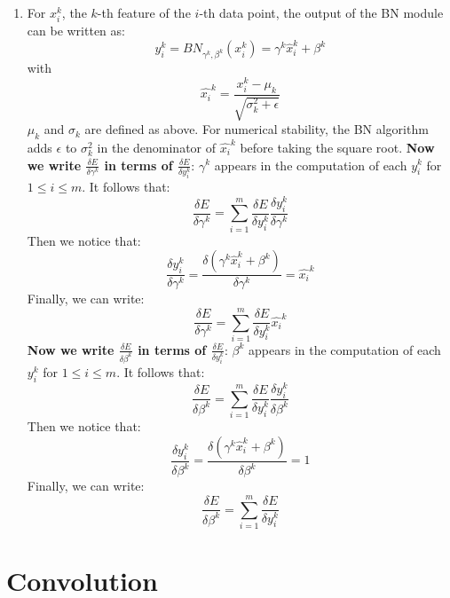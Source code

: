 \documentclass[a4paper]{article}
\begin{document}
\begin{enumerate}
\item{ For $x_i^k$, the $k$-th feature of the $i$-th data point, the output of the BN module can be written as:
$$y_i^k = BN_{\gamma^k,\beta^k}(x_i^k) = \gamma^k \hat{x}_i^k + \beta^k $$
with
$$\hat{x_i}^k = \frac{x_i^k - \mu_k}{\sqrt{\sigma_k^2 + \epsilon}}$$
$\mu_k$ and $\sigma_k$ are defined as above. For numerical stability, the BN algorithm adds $\epsilon$ to $\sigma_k^2$ in the denominator of $\hat{x_i}^k$ before taking the square root.
\newline
\newline
\textbf{Now we write $\frac{\delta E}{\delta \gamma^k}$ in terms of $\frac{\delta E}{\delta y_i^k}$}:
\newline
\newline
$\gamma^k$ appears in the computation of each $y_i^k$ for $1 \leq i \leq m$. It follows that:
$$\frac{\delta E}{\delta \gamma^k} = \sum_{i=1}^m \frac{\delta E}{\delta y_i^k} \frac{\delta y_i^k}{\delta \gamma^k} $$
Then we notice that:
$$ \frac{\delta y_i^k}{\delta \gamma^k} =  \frac{\delta ( \gamma^k \hat{x}_i^k + \beta^k )}{\delta \gamma^k} = \hat{x_i}^k$$
Finally, we can write:
$$\frac{\delta E}{\delta \gamma^k} = \sum_{i=1}^m \frac{\delta E}{\delta y_i^k} \hat{x_i}^k $$
\newline
\newline
\textbf{Now we write $\frac{\delta E}{\delta \beta^k}$ in terms of $\frac{\delta E}{\delta y_i^k}$}:
\newline
\newline
$\beta^k$ appears in the computation of each $y_i^k$ for $1 \leq i \leq m$. It follows that:
$$\frac{\delta E}{\delta \beta^k} = \sum_{i=1}^m \frac{\delta E}{\delta y_i^k} \frac{\delta y_i^k}{\delta \beta^k} $$
Then we notice that:
$$ \frac{\delta y_i^k}{\delta \beta^k} =  \frac{\delta ( \gamma^k \hat{x}_i^k + \beta^k )}{\delta \beta^k} = 1$$
Finally, we can write:
$$\frac{\delta E}{\delta \beta^k} = \sum_{i=1}^m \frac{\delta E}{\delta y_i^k} $$

}


\end{enumerate}

\section{Convolution}
\end{document}
